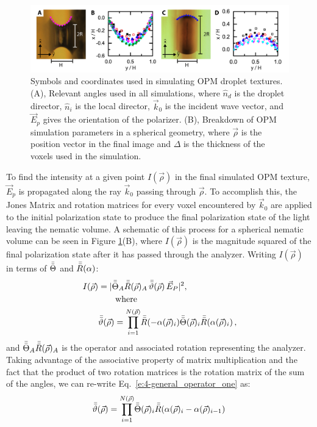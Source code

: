 \begin{figure}
\centering
\includegraphics{figures/C5/Ch5-Figs_ShapeContour.png}
\caption{Symbols and coordinates used in simulating OPM droplet textures.
(A), Relevant angles used in all simulations, where $\hat{n}_d$ is the droplet director, $\hat{n}_i$ is the local director, $\vec{k}_0$ is the incident wave vector, and $\vec{E}_p$ gives the orientation of the polarizer.
(B), Breakdown of OPM simulation parameters in a spherical geometry, where $\vec{\rho}$ is the position vector in the final image and $\Delta$ is the thickness of the voxels used in the simulation.}\label{f:4-generalcoords}
\end{figure}

To find the intensity at a given point $I(\vec{\rho})$ in the final simulated OPM texture, $\vec{E}_p$ is propagated along the ray $\vec{k}_0$ passing through $\vec{\rho}$.
To accomplish this, the Jones Matrix and rotation matrices for every voxel encountered by $\vec{k}_0$ are applied to the initial polarization state to produce the final polarization state of the light leaving the nematic volume.
A schematic of this process for a spherical nematic volume can be seen in Figure \ref{f:4-generalcoords}(B), where $I(\vec{\rho})$ is the magnitude squared of the final polarization state after it has passed through the analyzer.
Writing $I(\vec{\rho})$ in terms of $\bar{\bar{\Theta}}$ and $\bar{\bar{R}}(\alpha)$:
\begin{align}
I(\vec{\rho}) &= |\bar{\bar{\Theta}}_A \bar{\bar{R}}(\vec{\rho})_A\, \bar{\bar{\vartheta}}(\vec{\rho}) \, \vec{E}_P|^2, \, \label{e:4-Intensity} \\
 & \quad\quad\textrm{where}\\
        & \bar{\bar{\vartheta}}(\vec{\rho}) =  \prod_{i = 1}^{N(\vec{\rho})}\!\bar{\bar{R}}(-\alpha(\vec{\rho})_i) \bar{\bar{\Theta}}(\vec{\rho})_i \bar{\bar{R}}(\alpha(\vec{\rho})_i)\,, \label{e:4-general_operator_one}
\end{align}
and $\bar{\bar{\Theta}}_A \bar{\bar{R}}(\vec{\rho})_A$ is the operator and associated rotation representing the analyzer.
Taking advantage of the associative property of matrix multiplication and the fact that the product of two rotation matrices is the rotation matrix of the sum of the angles, we can re-write Eq.~\ref{e:4-general_operator_one} as:
\begin{equation}
\bar{\bar{\vartheta}}(\vec{\rho}) =  \prod_{i = 1}^{N(\vec{\rho})}\!\bar{\bar{\Theta}}(\vec{\rho})_i \bar{\bar{R}}(\alpha(\vec{\rho})_i-\alpha(\vec{\rho})_{i-1})\,
\end{equation}


